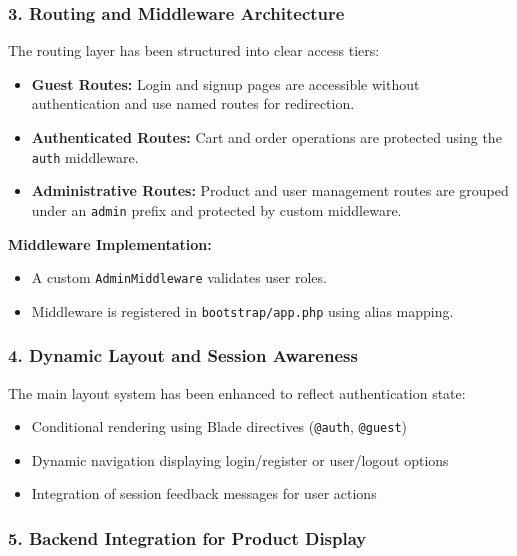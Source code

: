 \documentclass[12pt,a4paper]{article}
\begin{document}
\subsubsection{3. Routing and Middleware Architecture}

The routing layer has been structured into clear access tiers:

\begin{itemize}[noitemsep]
    \item \textbf{Guest Routes:} Login and signup pages are accessible without authentication and use named routes for redirection.
    \item \textbf{Authenticated Routes:} Cart and order operations are protected using the \texttt{auth} middleware.
    \item \textbf{Administrative Routes:} Product and user management routes are grouped under an \texttt{admin} prefix and protected by custom middleware.
\end{itemize}

\textbf{Middleware Implementation:}
\begin{itemize}[noitemsep]
    \item A custom \texttt{AdminMiddleware} validates user roles.
    \item Middleware is registered in \texttt{bootstrap/app.php} using alias mapping.
\end{itemize}

\subsubsection{4. Dynamic Layout and Session Awareness}

The main layout system has been enhanced to reflect authentication state:

\begin{itemize}[noitemsep]
    \item Conditional rendering using Blade directives (\texttt{@auth}, \texttt{@guest})
    \item Dynamic navigation displaying login/register or user/logout options
    \item Integration of session feedback messages for user actions
\end{itemize}

\subsubsection{5. Backend Integration for Product Display}
\end{document}
